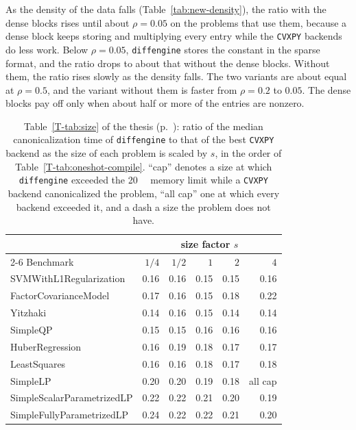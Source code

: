 \documentclass[letterpaper,12pt]{article}
\newcommand{\tpage}[1]{p.~\pageref{T-#1}}
\begin{document}
As the density of the data falls (Table~\ref{tab:new-density}), the ratio with the dense blocks
rises until about $\rho = 0.05$ on the problems that use them, because a dense block keeps
storing and multiplying every entry while the \texttt{CVXPY} backends do less work. Below
$\rho = 0.05$, \texttt{diffengine} stores the constant in the sparse format, and the ratio drops
to about that without the dense blocks. Without them, the ratio rises slowly as the density
falls. The two variants are about equal at $\rho = 0.5$, and the variant without them is faster
from $\rho = 0.2$ to $0.05$. The dense blocks pay off only when about half or more of
the entries are nonzero.

\begin{table}[htbp]
\centering
\caption{Table~\ref{T-tab:size} of the thesis (\tpage{tab:size}): ratio of the median canonicalization time of \texttt{diffengine}
to that of the best \texttt{CVXPY} backend as the size of each problem is scaled by $s$, in the
order of Table~\ref{T-tab:oneshot-compile}. ``cap'' denotes a size at which \texttt{diffengine}
exceeded the \SI{20}{\giga\byte} memory limit while a \texttt{CVXPY} backend canonicalized the problem, ``all
cap'' one at which every backend exceeded it, and a dash a size the problem does not have.}
\label{tab:new-size}
{\footnotesize
\begin{tabular}{l rrrrr}
\toprule
& \multicolumn{5}{c}{size factor $s$} \\
\cmidrule(lr){2-6}
Benchmark & $1/4$ & $1/2$ & $1$ & $2$ & $4$ \\
\midrule
SVMWithL1Regularization     &    0.16 &    0.16 &    0.15 &    0.15 &    0.16 \\
FactorCovarianceModel       &    0.17 &    0.16 &    0.15 &    0.18 &    0.22 \\
Yitzhaki                    &    0.14 &    0.16 &    0.15 &    0.14 &    0.14 \\
SimpleQP                    &    0.15 &    0.15 &    0.16 &    0.16 &    0.16 \\
HuberRegression             &    0.16 &    0.19 &    0.18 &    0.17 &    0.17 \\
LeastSquares                &    0.16 &    0.16 &    0.18 &    0.17 &    0.18 \\
SimpleLP                    &    0.20 &    0.20 &    0.19 &    0.18 & all cap \\
SimpleScalarParametrizedLP  &    0.22 &    0.22 &    0.21 &    0.20 &    0.19 \\
SimpleFullyParametrizedLP   &    0.24 &    0.22 &    0.22 &    0.21 &    0.20 \\

\end{tabular}}
\end{table}
\end{document}
